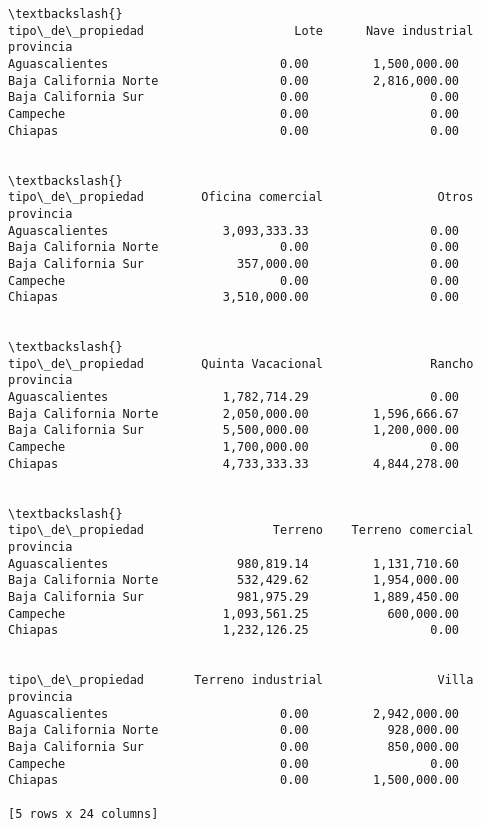 \documentclass[11pt]{article}
\begin{document}
\begin{tcolorbox}[breakable, boxrule=.5pt, size=fbox, pad at break*=1mm, opacityfill=0]
\begin{Verbatim}[commandchars=\\\{\}]
                                                                 \textbackslash{}
tipo\_de\_propiedad                     Lote      Nave industrial
provincia
Aguascalientes                        0.00         1,500,000.00
Baja California Norte                 0.00         2,816,000.00
Baja California Sur                   0.00                 0.00
Campeche                              0.00                 0.00
Chiapas                               0.00                 0.00

                                                                 \textbackslash{}
tipo\_de\_propiedad        Oficina comercial                Otros
provincia
Aguascalientes                3,093,333.33                 0.00
Baja California Norte                 0.00                 0.00
Baja California Sur             357,000.00                 0.00
Campeche                              0.00                 0.00
Chiapas                       3,510,000.00                 0.00

                                                                 \textbackslash{}
tipo\_de\_propiedad        Quinta Vacacional               Rancho
provincia
Aguascalientes                1,782,714.29                 0.00
Baja California Norte         2,050,000.00         1,596,666.67
Baja California Sur           5,500,000.00         1,200,000.00
Campeche                      1,700,000.00                 0.00
Chiapas                       4,733,333.33         4,844,278.00

                                                                 \textbackslash{}
tipo\_de\_propiedad                  Terreno    Terreno comercial
provincia
Aguascalientes                  980,819.14         1,131,710.60
Baja California Norte           532,429.62         1,954,000.00
Baja California Sur             981,975.29         1,889,450.00
Campeche                      1,093,561.25           600,000.00
Chiapas                       1,232,126.25                 0.00


tipo\_de\_propiedad       Terreno industrial                Villa
provincia
Aguascalientes                        0.00         2,942,000.00
Baja California Norte                 0.00           928,000.00
Baja California Sur                   0.00           850,000.00
Campeche                              0.00                 0.00
Chiapas                               0.00         1,500,000.00

[5 rows x 24 columns]
\end{Verbatim}
\end{tcolorbox}
        
\end{document}
